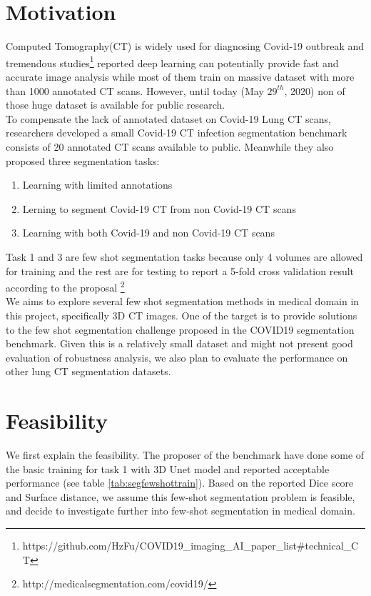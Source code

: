 \section{Motivation}
Computed Tomography(CT) is widely used for diagnosing Covid-19 outbreak and tremendous studies\footnote{https://github.com/HzFu/COVID19\_imaging\_AI\_paper\_list\#technical\_CT} reported deep learning can potentially provide fast and accurate image analysis while most of them train on massive dataset with more than 1000 annotated CT scans. However, until today (May $29^{th}$, 2020) non of those huge dataset is available for public research.\\

To compensate the lack of annotated dataset on Covid-19 Lung CT scans, researchers developed a small Covid-19 CT infection segmentation benchmark \cite{COVID-19-CT-Seg-Dataset}\cite{COVID-19-SegBenchmark} consists of 20 annotated CT scans available to public. Meanwhile they also proposed three segmentation tasks:
\begin{enumerate}
	\item Learning with limited annotations
	\item Lerning to segment Covid-19 CT from non Covid-19 CT scans
	\item Learning with both Covid-19 and non Covid-19 CT scans
\end{enumerate}
Task 1 and 3 are few shot segmentation tasks because only 4 volumes are allowed for training and the rest are for testing to report a 5-fold cross validation result according to the proposal \footnote{http://medicalsegmentation.com/covid19/}\\

We aims to explore several few shot segmentation methods in medical domain in this project, specifically 3D CT images. One of the target is to provide solutions to the few shot segmentation challenge proposed in the COVID19 segmentation benchmark. Given this is a relatively small dataset and might not present good evaluation of robustness analysis, we also plan to evaluate the performance on other lung CT segmentation datasets.

\section{Feasibility}
We first explain the feasibility. The proposer of the benchmark have done some of the basic training for task 1 with 3D Unet model and reported acceptable performance (see table \ref{tab:segfewshottrain}). Based on the reported Dice score and Surface distance, we assume this few-shot segmentation problem is feasible, and decide to investigate further into few-shot segmentation in medical domain.

